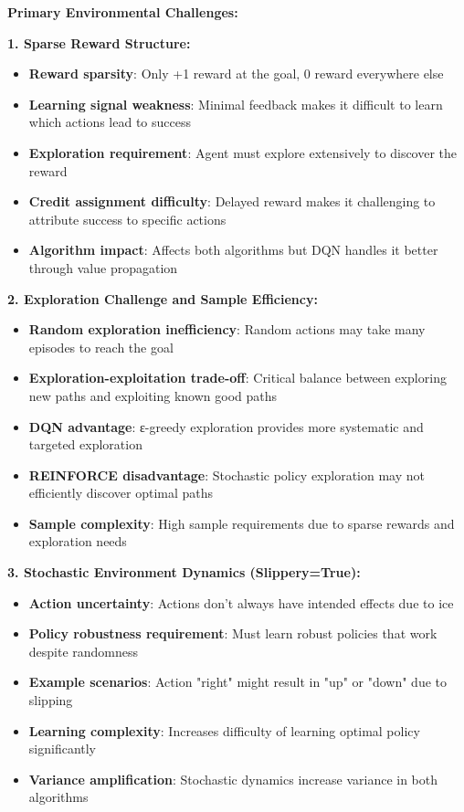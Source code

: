 \documentclass[12pt]{article}
\begin{document}
{{{\textbf{Primary Environmental Challenges:}

\textbf{1. Sparse Reward Structure:}
\begin{itemize}
    \item \textbf{Reward sparsity}: Only +1 reward at the goal, 0 reward everywhere else
    \item \textbf{Learning signal weakness}: Minimal feedback makes it difficult to learn which actions lead to success
    \item \textbf{Exploration requirement}: Agent must explore extensively to discover the reward
    \item \textbf{Credit assignment difficulty}: Delayed reward makes it challenging to attribute success to specific actions
    \item \textbf{Algorithm impact}: Affects both algorithms but DQN handles it better through value propagation
\end{itemize}

\textbf{2. Exploration Challenge and Sample Efficiency:}
\begin{itemize}
    \item \textbf{Random exploration inefficiency}: Random actions may take many episodes to reach the goal
    \item \textbf{Exploration-exploitation trade-off}: Critical balance between exploring new paths and exploiting known good paths
    \item \textbf{DQN advantage}: ε-greedy exploration provides more systematic and targeted exploration
    \item \textbf{REINFORCE disadvantage}: Stochastic policy exploration may not efficiently discover optimal paths
    \item \textbf{Sample complexity}: High sample requirements due to sparse rewards and exploration needs
\end{itemize}

\textbf{3. Stochastic Environment Dynamics (Slippery=True):}
\begin{itemize}
    \item \textbf{Action uncertainty}: Actions don't always have intended effects due to ice
    \item \textbf{Policy robustness requirement}: Must learn robust policies that work despite randomness
    \item \textbf{Example scenarios}: Action "right" might result in "up" or "down" due to slipping
    \item \textbf{Learning complexity}: Increases difficulty of learning optimal policy significantly
    \item \textbf{Variance amplification}: Stochastic dynamics increase variance in both algorithms
\end{itemize}

}}}
\end{document}
